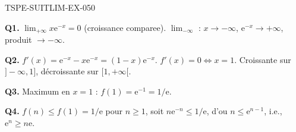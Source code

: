 \begin{corrige}{TSPE-SUITLIM-EX-050}

\textbf{Q1.} $\lim_{+\infty} x\mathrm{e}^{-x} = 0$ (croissance comparee). $\lim_{-\infty}$ : $x \to -\infty$, $\mathrm{e}^{-x} \to +\infty$, produit $\to -\infty$.

\textbf{Q2.} $f'(x) = \mathrm{e}^{-x} - x\mathrm{e}^{-x} = (1-x)\mathrm{e}^{-x}$. $f'(x)=0 \iff x=1$. Croissante sur $]-\infty,1]$, décroissante sur $[1,+\infty[$.

\textbf{Q3.} Maximum en $x=1$ : $f(1) = \mathrm{e}^{-1} = 1/\mathrm{e}$.

\textbf{Q4.} $f(n) \leq f(1) = 1/\mathrm{e}$ pour $n \geq 1$, soit $n\mathrm{e}^{-n} \leq 1/\mathrm{e}$, d'ou $\boxed{n \leq \mathrm{e}^{n-1}}$, i.e., $\mathrm{e}^n \geq n\mathrm{e}$.

\end{corrige}
